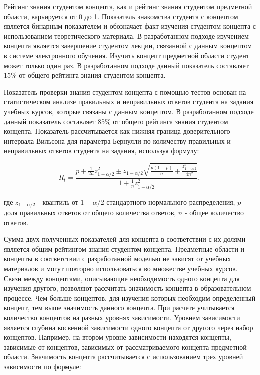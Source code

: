Рейтинг знания студентом концепта, как и рейтинг знания студентом предметной области, варьируется от 0 до 1. Показатель знакомства студента с концептом является бинарным показателем и обозначает факт изучения студентом концепта с использованием теоретического материала. В разработанном подходе изучением концепта является завершение студентом лекции, связанной с данным концептом в системе электронного обучения. Изучить концепт предметной области студент может только один раз. В разработанном подходе данный показатель составляет 15\% от общего рейтинга знания студентом концепта.

Показатель проверки знания студентом концепта с помощью тестов основан на статистическом анализе правильных и неправильных ответов студента на задания учебных курсов, которые связаны с данным концептом. В разработанном подходе данный показатель составляет 85\% от общего рейтинга знания студентом концепта. Показатель рассчитывается как нижняя граница доверительного интервала Вильсона для параметра Бернулли по количеству правильных и неправильных ответов студента на задания, используя формулу:

$$
    R_t = \frac{p+\frac{1}{2n}z_{1-\alpha/2}^2 \pm z_{1-\alpha/2}\sqrt{\frac{p(1-p)}{n}+\frac{z_{1-\alpha/2}^2}{4n^2}}{} }{1+\frac{1}{n}z_{1-\alpha/2}^2},
$$

где \(z_{1-\alpha/2}\) - квантиль от \(1-\alpha/2\) стандартного нормального распределения, \(p\) - доля правильных ответов от общего количества ответов, \(n\) - общее количество ответов. 

Сумма двух полученных показателей для концепта в соответствии с их долями является общим рейтингом знания студентом концепта. Предметные области и концепты в соответствии с разработанной моделью не зависят от учебных материалов и могут повторно использоваться во множестве учебных курсов. Связи между концептами, описывающие необходимость одного концепта для изучения другого, позволяют рассчитать значимость концепта в образовательном процессе. Чем больше концептов, для изучения которых необходим определенный концепт, тем выше значимость данного концепта. При расчете учитывается количество концептов на разных уровнях зависимости. Уровнем зависимости является глубина косвенной зависимости одного концепта от другого через набор концептов. Например, на втором уровне зависимости находятся концепты, зависимые от концептов, зависимых от рассматриваемого концепта предметной области. Значимость концепта рассчитывается с использованием трех уровней зависимости по формуле: 

